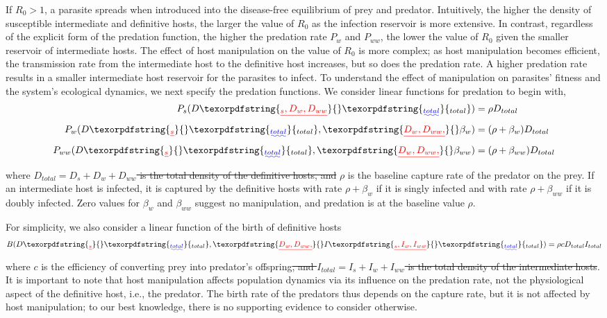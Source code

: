 \documentclass[a4paper]{scrartcl}
\providecommand{\DIFaddtex}[1]{{\protect\color{blue}\uwave{#1}}} %
\providecommand{\DIFdeltex}[1]{{\protect\color{red}\sout{#1}}}                      %
\providecommand{\DIFaddbegin}{} %
\providecommand{\DIFaddend}{} %
\providecommand{\DIFdelbegin}{} %
\providecommand{\DIFdelend}{} %
\providecommand{\DIFadd}[1]{\texorpdfstring{\DIFaddtex{#1}}{#1}} %
\providecommand{\DIFdel}[1]{\texorpdfstring{\DIFdeltex{#1}}{}} %
\newcommand{\DIFscaledelfig}{0.5}
\newlength{\DIFdelgraphicswidth} %
\newlength{\DIFdelgraphicsheight} %
\newcommand{\DIFaddincludegraphics}[2][]{{\color{blue}\fbox{\DIFOincludegraphics[#1]{#2}}}} %
\newcommand{\DIFdelincludegraphics}[2][]{%
\sbox{\DIFdelgraphicsbox}{\DIFOincludegraphics[#1]{#2}}%
\settoboxwidth{\DIFdelgraphicswidth}{\DIFdelgraphicsbox} %
\settoboxtotalheight{\DIFdelgraphicsheight}{\DIFdelgraphicsbox} %
\scalebox{\DIFscaledelfig}{%
\parbox[b]{\DIFdelgraphicswidth}{\usebox{\DIFdelgraphicsbox}\\[-\baselineskip] \rule{\DIFdelgraphicswidth}{0em}}\llap{\resizebox{\DIFdelgraphicswidth}{\DIFdelgraphicsheight}{%
\setlength{\unitlength}{\DIFdelgraphicswidth}%
\begin{picture}(1,1)%
\thicklines\linethickness{2pt} %
{\color[rgb]{1,0,0}\put(0,0){\framebox(1,1){}}}%
{\color[rgb]{1,0,0}\put(0,0){\line( 1,1){1}}}%
{\color[rgb]{1,0,0}\put(0,1){\line(1,-1){1}}}%
\end{picture}%
}\hspace*{3pt}}} %
} %
\DeclareRobustCommand{\DIFaddbegin}{\DIFOaddbegin \let\includegraphics\DIFaddincludegraphics} %
\DeclareRobustCommand{\DIFaddend}{\DIFOaddend \let\includegraphics\DIFOincludegraphics} %
\DeclareRobustCommand{\DIFdelbegin}{\DIFOdelbegin \let\includegraphics\DIFdelincludegraphics} %
\DeclareRobustCommand{\DIFdelend}{\DIFOaddend \let\includegraphics\DIFOincludegraphics} %
\begin{document}
If $R_0 > 1$, a parasite spreads when introduced into the disease-free equilibrium of prey and predator.
Intuitively, the higher the density of susceptible intermediate and definitive hosts, the larger the value of $R_0$ as the infection reservoir is more extensive. 
In contrast, regardless of the explicit form of the predation function, the higher the predation rate $P_w$ and $P_{ww}$, the lower the value of $R_0$ given the smaller reservoir of intermediate hosts. 
The effect of host manipulation on the value of $R_0$ is more complex; as host manipulation becomes efficient, the transmission rate from the intermediate host to the definitive host increases, but so does the predation rate. 
A higher predation rate results in a smaller intermediate host reservoir for the parasites to infect. 
To understand the effect of manipulation on parasites' fitness and the system's ecological dynamics, we next specify the predation functions. 
We consider linear functions for predation to begin with,
%
\begin{align*}
 P_s(D\DIFdelbegin \DIFdel{_s, D_w, D_{ww}}\DIFdelend \DIFaddbegin \DIFadd{_{total}}\DIFaddend ) &= \rho D_{total}  \\
 P_w(D\DIFdelbegin \DIFdel{_s}\DIFdelend \DIFaddbegin \DIFadd{_{total}}\DIFaddend , \DIFdelbegin \DIFdel{D_w, D_{ww}, }\DIFdelend \beta_w) &= (\rho + \beta_w) D_{total} \\
 P_{ww}(D\DIFdelbegin \DIFdel{_s}\DIFdelend \DIFaddbegin \DIFadd{_{total}}\DIFaddend , \DIFdelbegin \DIFdel{D_w, D_{ww}, }\DIFdelend \beta_{ww}) &=  (\rho + \beta_{ww})D_{total}
\end{align*}
%
where  \DIFdelbegin \DIFdel{$D_{total} = D_s + D_w + D_{ww}$ is the total density of the definitive hosts, and }\DIFdelend $\rho$ is the baseline capture rate of the predator on the prey. 
If an intermediate host is infected, it is captured by the definitive hosts with rate $\rho + \beta_w$ if it is singly infected and with rate $\rho + \beta_{ww}$ if it is doubly infected. 
Zero values for $\beta_w$ and $\beta_{ww}$ suggest no manipulation, and predation is at the baseline value $\rho$.

For simplicity, we also consider a linear function of the birth of definitive hosts
%
\begin{align*}
B(D\DIFdelbegin \DIFdel{_s}\DIFdelend \DIFaddbegin \DIFadd{_{total}}\DIFaddend ,  \DIFdelbegin \DIFdel{D_w, D_{ww}, }\DIFdelend I\DIFdelbegin \DIFdel{_s, I_w, I_{ww}}\DIFdelend \DIFaddbegin \DIFadd{_{total}}\DIFaddend ) = \rho c D_{total} I_{total}
\end{align*}
%
where $c$ is the efficiency of converting prey into predator's offspring\DIFdelbegin \DIFdel{, and $I_{total} = I_s + I_w + I_{ww}$ is the total density of the intermediate hosts}\DIFdelend .
It is important to note that host manipulation affects population dynamics via its influence on the predation rate, not the physiological aspect of the definitive host, i.e., the predator.
The birth rate of the predators thus depends on the capture rate, but it is not affected by host manipulation; to our best knowledge, there is no supporting evidence to consider otherwise.
\end{document}
